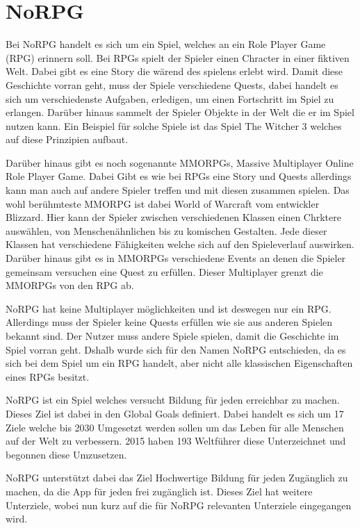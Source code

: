 \chapter{NoRPG}
Bei NoRPG handelt es sich um ein Spiel, welches an ein Role Player Game (RPG) erinnern soll. Bei RPGs spielt der Spieler einen Chracter in einer fiktiven Welt. Dabei gibt es eine Story die wärend des spielens erlebt wird. Damit diese Geschichte vorran geht, muss der Spiele verschiedene Quests, dabei handelt es sich um verschiedenste Aufgaben, erledigen, um einen Fortschritt im Spiel zu erlangen. Darüber hinaus sammelt der Spieler Objekte in der Welt die er im Spiel nutzen kann. Ein Beispiel für solche Spiele ist das Spiel The Witcher 3 welches auf diese Prinzipien aufbaut. 
	
Darüber hinaus gibt es noch sogenannte MMORPGs, Massive Multiplayer Online Role Player Game. Dabei Gibt es wie bei RPGs eine Story und Quests allerdings kann man auch auf andere Spieler treffen und mit diesen zusammen spielen. Das wohl berühmteste MMORPG ist dabei World of Warcraft vom entwickler Blizzard. Hier kann der Spieler zwischen verschiedenen Klassen einen Chrktere auswählen, von Menschenähnlichen bis zu komischen Gestalten. Jede dieser Klassen hat verschiedene Fähigkeiten welche sich auf den Spieleverlauf auswirken. Darüber hinaus gibt es in MMORPGs verschiedene Events an denen die Spieler gemeinsam versuchen eine Quest zu erfüllen. Dieser Multiplayer grenzt die MMORPGs von den RPG ab.

NoRPG hat keine Multiplayer möglichkeiten und ist deswegen nur ein RPG. Allerdings muss der Spieler keine Quests erfüllen wie sie aus anderen Spielen bekannt sind. Der Nutzer muss andere Spiele spielen, damit die Geschichte im Spiel vorran geht. Dshalb wurde sich für den Namen NoRPG entschieden, da es sich bei dem Spiel um ein RPG handelt, aber nicht alle klassischen Eigenschaften eines RPGs besitzt.
	
NoRPG ist ein Spiel welches versucht Bildung für jeden erreichbar zu machen. Dieses Ziel ist dabei in den Global Goals definiert. Dabei handelt es sich um 17 Ziele welche bis 2030 Umgesetzt werden sollen um das Leben für alle Menschen auf der Welt zu verbessern. 2015 haben 193 Weltführer diese Unterzeichnet und begonnen diese Umzusetzen. 

NoRPG unterstützt dabei das Ziel Hochwertige Bildung für jeden Zugänglich zu machen, da die App für jeden frei zugänglich ist. Dieses Ziel  hat weitere Unterziele, wobei nun kurz auf die für NoRPG relevanten Unterziele eingegangen wird.

